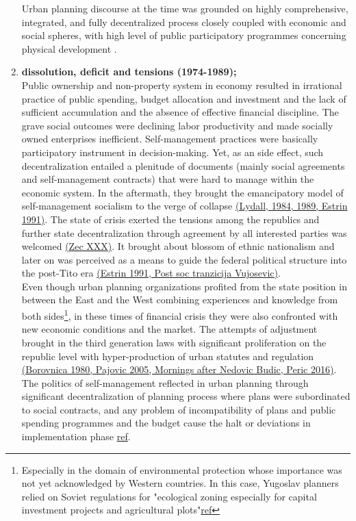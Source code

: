\documentclass[11pt]{report}
\begin{document}
\begin{enumerate}
Urban planning discourse at the time was grounded on highly comprehensive, integrated, and fully decentralized process closely coupled with economic and social spheres, with high level of public participatory programmes concerning physical development \href{ref}{\citealt{nedovic-budic_mornings_2011}}.

\item \textbf{dissolution, deficit and tensions (1974-1989);}
\\
Public ownership and non-property system in economy resulted in irrational practice of public spending, budget allocation and investment and the lack of sufficient accumulation and the  absence  of  effective  financial  discipline.
The grave social outcomes were declining labor productivity and made socially owned enterprises inefficient.
Self-management practices were basically participatory instrument in decision-making. Yet, as an side effect, such decentralization entailed a plenitude of documents (mainly social agreements and self-management contracts) that were hard to manage within the economic system.
In the aftermath, they brought the emancipatory model of self-management socialism to the verge of collapse \href{ref}{(Lydall,  1984, 1989, Estrin 1991)}.
The state of crisis exerted the tensions among the republics and further state decentralization through  agreement  by  all  interested parties was welcomed \href{ref}{(Zec XXX)}. It brought about blossom of ethnic nationalism and later on was perceived as a means to guide  the  federal  political  structure  into  the post-Tito era \href{ref}{(Estrin 1991, Post soc tranzicija Vujosevic)}.
\\

Even though urban planning organizations profited from the state position in between the East and the West combining experiences and knowledge from both sides\footnote{Especially in the domain of environmental protection whose importance was not yet acknowledged by Western countries. In this case, Yugoslav planners relied on Soviet regulations for "ecological zoning especially for capital investment projects and agricultural plots"\href{ref}{ref}}, in these times of financial crisis they were also confronted with new economic conditions and the market.
The attempts of adjustment brought in the third generation laws with significant proliferation on the republic level with hyper-production of urban statutes and regulation \href{ref}{(Borovnica 1980, Pajovic 2005, Mornings after Nedovic Budic, Peric 2016)}.
The politics of self-management reflected in urban planning through significant decentralization of planning process where plans were subordinated to social contracts, and any problem of incompatibility of plans and public spending programmes and the budget cause the halt or deviations in implementation phase \href{ref}{ref}.


\end{enumerate}
\end{document}
